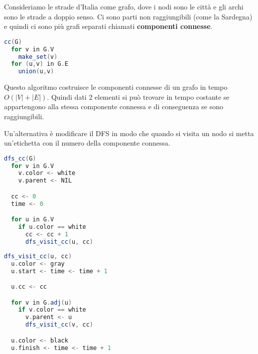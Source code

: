 \documentclass[a4paper]{article}
\begin{document}
\begin{example}
  Consideriamo le strade d'Italia come grafo, dove i nodi sono le città e gli archi
  sono le strade a doppio senso. Ci sono parti non raggiungibili (come la Sardegna)
  e quindi ci sono più grafi separati chiamati \textbf{componenti connesse}.
\begin{lstlisting}[language=Scala]
cc(G)
  for v in G.V
    make_set(v)
  for (u,v) in G.E
    union(u,v)
\end{lstlisting}
  Questo algoritmo costruisce le componenti connesse di un grafo in tempo \(O(|V| + |E|)\).
  Quindi dati 2 elementi si può trovare in tempo costante se appartengono alla stessa
  componente connessa e di conseguenza se sono raggiungibili.

  Un'alternativa è modificare il DFS in modo che quando si visita un nodo si metta
  un'etichetta con il numero della componente connessa.
\begin{lstlisting}[language=Scala]
dfs_cc(G)
  for v in G.V
    v.color <- white
    v.parent <- NIL

  cc <- 0
  time <- 0

  for u in G.V
    if u.color == white
      cc <- cc + 1
      dfs_visit_cc(u, cc)
\end{lstlisting}
\begin{lstlisting}[language=Scala]
dfs_visit_cc(u, cc)
  u.color <- gray
  u.start <- time <- time + 1

  u.cc <- cc

  for v in G.adj(u)
    if v.color == white
      v.parent <- u
      dfs_visit_cc(v, cc)

  u.color <- black
  u.finish <- time <- time + 1
\end{lstlisting}
\end{example}
\end{document}
